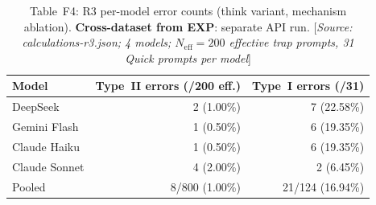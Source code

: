 \documentclass[11pt,a4paper]{article}
\begin{document}
\begin{table}[htbp]
\centering
\caption{Table~F3b: EXP per-model Type~I error counts (same run as F3a).
  [\emph{Source: calculations-expanded.json; 4 models; $N_\text{Quick} = 31$
  per model, 124 pooled}]}
\label{tab:f3b}
\smallskip
{}
\end{table}

\begin{table}[htbp]
\centering
\caption{Table~F4: R3 per-model error counts (\textsf{think} variant,
  mechanism ablation).  \textbf{Cross-dataset from EXP}: separate API run.
  [\emph{Source: calculations-r3.json; 4 models; $N_\text{eff} = 200$
  effective trap prompts, 31 Quick prompts per model}]}
\label{tab:f4}
\smallskip
\begin{tabular}{@{}lrr@{}}
\toprule
Model & Type~II errors (/200 eff.) & Type~I errors (/31) \\
\midrule
DeepSeek       & 2 (1.00\%) &  7 (22.58\%) \\
Gemini Flash   & 1 (0.50\%) &  6 (19.35\%) \\
Claude Haiku   & 1 (0.50\%) &  6 (19.35\%) \\
Claude Sonnet  & 4 (2.00\%) &  2 (6.45\%) \\
\midrule
Pooled & 8/800 (1.00\%) & 21/124 (16.94\%) \\
\bottomrule
\end{tabular}
\end{table}
\end{document}
